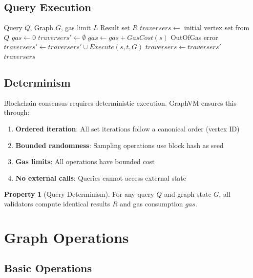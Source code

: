 \documentclass[11pt,a4paper]{article}
\theoremstyle{definition}
\newtheorem{property}{Property}
\begin{document}
\subsection{Query Execution}

\begin{algorithm}
\caption{Traversal Execution}
\begin{algorithmic}[1]
\Require Query $Q$, Graph $G$, gas limit $L$
\Ensure Result set $R$
\State $traversers \gets$ initial vertex set from $Q$
\State $gas \gets 0$
    \State $traversers' \gets \emptyset$
        \State $gas \gets gas + GasCost(s)$
            \State \Return OutOfGas error
        \EndIf
        \State $traversers' \gets traversers' \cup Execute(s, t, G)$
    \EndFor
    \State $traversers \gets traversers'$
\EndFor
\State \Return $traversers$
\end{algorithmic}
\end{algorithm}

\subsection{Determinism}

Blockchain consensus requires deterministic execution. GraphVM ensures this through:

\begin{enumerate}
    \item \textbf{Ordered iteration}: All set iterations follow a canonical order (vertex ID)
    \item \textbf{Bounded randomness}: Sampling operations use block hash as seed
    \item \textbf{Gas limits}: All operations have bounded cost
    \item \textbf{No external calls}: Queries cannot access external state
\end{enumerate}

\begin{property}[Query Determinism]
For any query $Q$ and graph state $G$, all validators compute identical results $R$ and gas consumption $gas$.
\end{property}

\section{Graph Operations}

\subsection{Basic Operations}
\end{document}
